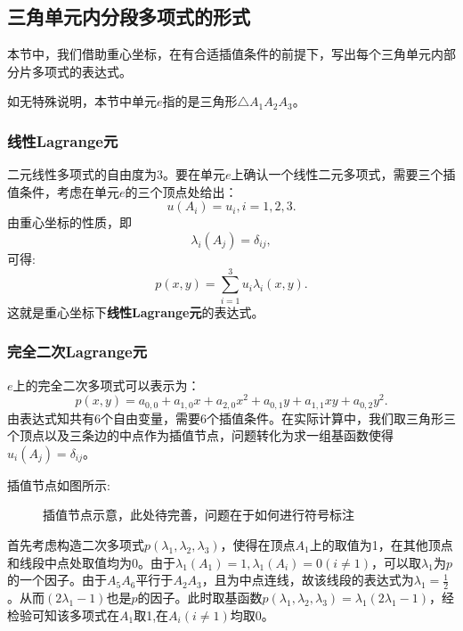 \subsection{三角单元内分段多项式的形式}
本节中，我们借助重心坐标，在有合适插值条件的前提下，写出每个三角单元内部分片多项式的表达式。

如无特殊说明，本节中单元$e$指的是三角形$\triangle A_{1}A_{2}A_{3}$。
\subsubsection{线性Lagrange元}
二元线性多项式的自由度为3。要在单元$e$上确认一个线性二元多项式，需要三个插值条件，考虑在单元$e$的三个顶点处给出：
\begin{equation}
    \label{eq:LinearCond}
    u(A_{i})=u_{i},i=1,2,3.
\end{equation}
由重心坐标的性质，即
\begin{equation}
    \lambda_{i}(A_{j})=\delta_{ij},
\end{equation}
可得:
\begin{equation}
    p(x,y)=\sum_{i=1}^{3}u_{i}\lambda_{i}(x,y).
\end{equation}
这就是重心坐标下\textbf{线性Lagrange元}的表达式。
\subsubsection{完全二次Lagrange元}
$e$上的完全二次多项式可以表示为：
\begin{equation}
    p(x,y)=a_{0,0}+a_{1,0}x+a_{2,0}x^2+a_{0,1}y+a_{1,1}xy+a_{0,2}y^{2}.
\end{equation}
由表达式知共有6个自由变量，需要6个插值条件。在实际计算中，我们取三角形三个顶点以及三条边的中点作为插值节点，问题转化为求一组基函数使得$u_{i}(A_{j})=\delta_{ij}$。

插值节点如图所示:
\begin{figure}[H]
    \caption{插值节点示意，此处待完善，问题在于如何进行符号标注}
    \centering
{}
\end{figure}
首先考虑构造二次多项式$p(\lambda_{1},\lambda_{2},\lambda_{3})$，使得在顶点$A_{1}$上的取值为1，在其他顶点和线段中点处取值均为0。由于$\lambda_{1}(A_{1})=1,\lambda_{1}(A_{i})=0(i\neq 1)$，可以取$\lambda_{1}$为$p$的一个因子。由于$A_{5}A_{6}$平行于$A_{2}A_{3}$，且为中点连线，故该线段的表达式为$\lambda_{1}=\frac{1}{2}$。从而$(2\lambda_{1}-1)$也是$p$的因子。此时取基函数$p(\lambda_{1},\lambda_{2},\lambda_{3})=\lambda_{1}(2\lambda_{1}-1)$，经检验可知该多项式在$A_{1}$取1,在$A_{i}(i\neq 1)$均取0。

